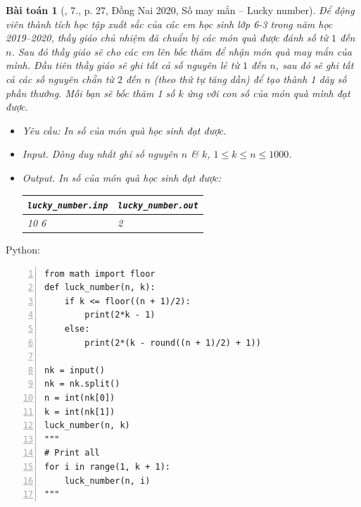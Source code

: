 \documentclass{article}
\newtheorem{baitoan}{Bài toán}
\begin{document}
\begin{baitoan}[\cite{VietSTEM2021}, 7., p. 27, Đồng Nai 2020, Số may mắn -- Lucky number]
	Để động viên thành tích học tập xuất sắc của các em học sinh lớp 6-3 trong năm học 2019--2020, thầy giáo chủ nhiệm đã chuẩn bị các món quà được đánh số từ $1$ đến $n$. Sau đó thầy giáo sẽ cho các em lên bốc thăm để nhận món quà may mắn của mình. Đầu tiên thầy giáo sẽ ghi tất cả số nguyên lẻ từ $1$ đến $n$, sau đó sẽ ghi tất cả các số nguyên chẵn từ $2$ đến $n$ (theo thứ tự tăng dần) để tạo thành 1 dãy số phần thưởng. Mỗi bạn sẽ bốc thăm 1 số $k$ ứng với con số của món quà mình đạt được.
	\begin{itemize}
		\item {\sf Yêu cầu:} In số của món quà học sinh đạt được.
		\item {\sf Input.} Dòng duy nhất ghi số nguyên $n$ \& $k$, $1\le k\le n\le1000$.
		\item {\sf Output.} In số của món quà học sinh đạt được:
		\begin{table}[H]
			\centering
			\begin{tabular}{|l|l|}
				\hline
				\verb|lucky_number.inp| & \verb|lucky_number.out| \\
				\hline
				10 6 & 2 \\
				\hline
			\end{tabular}
		\end{table}
	\end{itemize}
\end{baitoan}
Python:
\begin{Verbatim}[numbers=left,xleftmargin=5mm]
from math import floor
def luck_number(n, k):
    if k <= floor((n + 1)/2):
        print(2*k - 1)
    else:
        print(2*(k - round((n + 1)/2) + 1))

nk = input()
nk = nk.split()
n = int(nk[0])
k = int(nk[1])
luck_number(n, k)
"""
# Print all
for i in range(1, k + 1):
    luck_number(n, i)
"""
\end{Verbatim}
\end{document}
